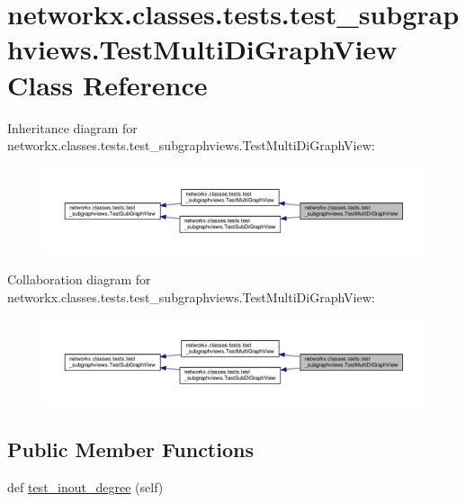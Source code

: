 \hypertarget{classnetworkx_1_1classes_1_1tests_1_1test__subgraphviews_1_1TestMultiDiGraphView}{}\section{networkx.\+classes.\+tests.\+test\+\_\+subgraphviews.\+Test\+Multi\+Di\+Graph\+View Class Reference}
\label{classnetworkx_1_1classes_1_1tests_1_1test__subgraphviews_1_1TestMultiDiGraphView}


Inheritance diagram for networkx.\+classes.\+tests.\+test\+\_\+subgraphviews.\+Test\+Multi\+Di\+Graph\+View\+:
\nopagebreak
\begin{figure}[H]
\begin{center}
\leavevmode
\includegraphics[width=350pt]{classnetworkx_1_1classes_1_1tests_1_1test__subgraphviews_1_1TestMultiDiGraphView__inherit__graph}
\end{center}
\end{figure}


Collaboration diagram for networkx.\+classes.\+tests.\+test\+\_\+subgraphviews.\+Test\+Multi\+Di\+Graph\+View\+:
\nopagebreak
\begin{figure}[H]
\begin{center}
\leavevmode
\includegraphics[width=350pt]{classnetworkx_1_1classes_1_1tests_1_1test__subgraphviews_1_1TestMultiDiGraphView__coll__graph}
\end{center}
\end{figure}
\subsection*{Public Member Functions}
\begin{DoxyCompactItemize}
\item 
def \hyperlink{classnetworkx_1_1classes_1_1tests_1_1test__subgraphviews_1_1TestMultiDiGraphView_a7188f1e7e2b7afb75d7035ad82db25bc}{test\+\_\+inout\+\_\+degree} (self)
\end{DoxyCompactItemize}
